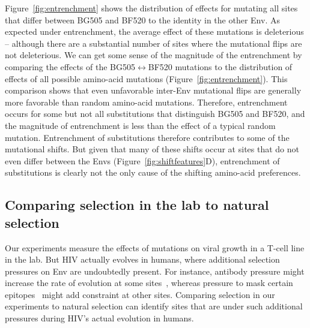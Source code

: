 \documentclass[9pt]{elife}
\begin{document}
Figure~\ref{fig:entrenchment} shows the distribution of effects for mutating all sites that differ between BG505 and BF520 to the identity in the other Env.
As expected under entrenchment, the average effect of these mutations is deleterious -- although there are a substantial number of sites where the mutational flips are not deleterious. 
We can get some sense of the magnitude of the entrenchment by comparing the effects of the BG505$\leftrightarrow$BF520 mutations to the distribution of effects of all possible amino-acid mutations (Figure~\ref{fig:entrenchment}).
This comparison shows that even unfavorable inter-Env mutational flips are generally more favorable than random amino-acid mutations.
Therefore, entrenchment occurs for some but not all substitutions that distinguish BG505 and BF520, and the magnitude of entrenchment is less than the effect of a typical random mutation.
Entrenchment of substitutions therefore contributes to some of the mutational shifts.
But given that many of these shifts occur at sites that do not even differ between the Envs (Figure~\ref{fig:shiftfeatures}D), entrenchment of substitutions is clearly not the only cause of the shifting amino-acid preferences.


\subsection{Comparing selection in the lab to natural selection}
Our experiments measure the effects of mutations on viral growth in a T-cell line in the lab.
But HIV actually evolves in humans, where additional selection pressures on Env are undoubtedly present.
For instance, antibody pressure might increase the rate of evolution at some sites~\citep{albert1990rapid,wei2003antibody,richman2003rapid}, whereas pressure to mask certain epitopes~\citep{kwong2002hiv} might add constraint at other sites. 
Comparing selection in our experiments to natural selection can identify sites that are under such additional pressures during HIV's actual evolution in humans.
\end{document}
